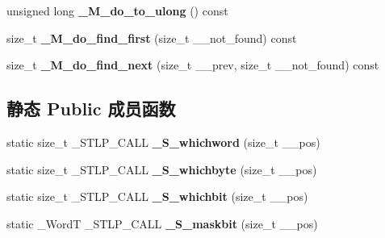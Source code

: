 \begin{DoxyCompactItemize}
\item 
\mbox{\label{struct___base__bitset_3_011_u_l_01_4_a1dc99fb9b38b489be061d751f20e994c}} 
unsigned long {\bfseries \+\_\+\+M\+\_\+do\+\_\+to\+\_\+ulong} () const
\item 
\mbox{\label{struct___base__bitset_3_011_u_l_01_4_a3ed4f0c4c49aaf078e844403b392159c}} 
size\+\_\+t {\bfseries \+\_\+\+M\+\_\+do\+\_\+find\+\_\+first} (size\+\_\+t \+\_\+\+\_\+not\+\_\+found) const
\item 
\mbox{\label{struct___base__bitset_3_011_u_l_01_4_a566f681fa1fe2392833a7474d661f397}} 
size\+\_\+t {\bfseries \+\_\+\+M\+\_\+do\+\_\+find\+\_\+next} (size\+\_\+t \+\_\+\+\_\+prev, size\+\_\+t \+\_\+\+\_\+not\+\_\+found) const
\end{DoxyCompactItemize}
\subsection*{静态 Public 成员函数}
\begin{DoxyCompactItemize}
\item 
\mbox{\label{struct___base__bitset_3_011_u_l_01_4_ad5aa41076cf4d43d7d9ca44fc0f96abf}} 
static size\+\_\+t \+\_\+\+S\+T\+L\+P\+\_\+\+C\+A\+LL {\bfseries \+\_\+\+S\+\_\+whichword} (size\+\_\+t \+\_\+\+\_\+pos)
\item 
\mbox{\label{struct___base__bitset_3_011_u_l_01_4_a3400f0725dccb2af191b084b524e66df}} 
static size\+\_\+t \+\_\+\+S\+T\+L\+P\+\_\+\+C\+A\+LL {\bfseries \+\_\+\+S\+\_\+whichbyte} (size\+\_\+t \+\_\+\+\_\+pos)
\item 
\mbox{\label{struct___base__bitset_3_011_u_l_01_4_ae2f300b526c8e0a3d069b27592dfbade}} 
static size\+\_\+t \+\_\+\+S\+T\+L\+P\+\_\+\+C\+A\+LL {\bfseries \+\_\+\+S\+\_\+whichbit} (size\+\_\+t \+\_\+\+\_\+pos)
\item 
\mbox{\label{struct___base__bitset_3_011_u_l_01_4_a89a25770e209305e4b049afe48e7b1f8}} 
static \+\_\+\+WordT \+\_\+\+S\+T\+L\+P\+\_\+\+C\+A\+LL {\bfseries \+\_\+\+S\+\_\+maskbit} (size\+\_\+t \+\_\+\+\_\+pos)
\end{DoxyCompactItemize}
